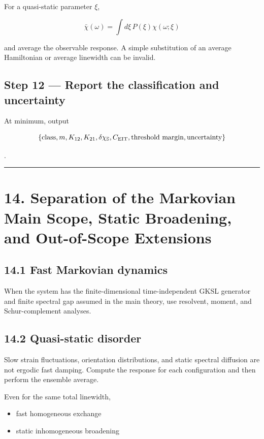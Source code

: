 \documentclass[
  10pt,
  a4paper,
]{article}
\providecommand{\tightlist}{%
  \setlength{\itemsep}{0pt}\setlength{\parskip}{0pt}}
\begin{document}
For a quasi-static parameter \(\xi\),

\[
\bar\chi(\omega)
=\int d\xi\,P(\xi)\chi(\omega;\xi)
\]

and average the observable response. A simple substitution of an average
Hamiltonian or average linewidth can be invalid.

\subsection{Step 12 --- Report the classification and
uncertainty}\label{step-12-report-the-classification-and-uncertainty}

At minimum, output

\[
\{\text{class},m,K_{12},K_{21},\delta\chi_{\mathbb S},C_{\rm EIT},\text{threshold margin},\text{uncertainty}\}
\]

.

\begin{center}\rule{0.5\linewidth}{0.5pt}\end{center}

\section{14. Separation of the Markovian Main Scope, Static Broadening,
and Out-of-Scope
Extensions}\label{separation-of-the-markovian-main-scope-static-broadening-and-out-of-scope-extensions}

\subsection{14.1 Fast Markovian dynamics}\label{fast-markovian-dynamics}

When the system has the finite-dimensional time-independent GKSL
generator and finite spectral gap assumed in the main theory, use
resolvent, moment, and Schur-complement analyses.

\subsection{14.2 Quasi-static disorder}\label{quasi-static-disorder}

Slow strain fluctuations, orientation distributions, and static spectral
diffusion are not ergodic fast damping. Compute the response for each
configuration and then perform the ensemble average.

Even for the same total linewidth,

\begin{itemize}
\tightlist
\item
  fast homogeneous exchange
\item
  static inhomogeneous broadening
\end{itemize}
\end{document}

